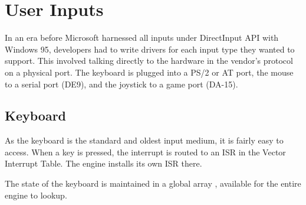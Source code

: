 \section{User Inputs}
In an era before Microsoft harnessed all inputs under DirectInput API with Windows 95, developers had to write drivers for each input type they wanted to support. This involved talking directly to the hardware in the vendor's protocol on a physical port. The keyboard is plugged into a PS/2 or AT port, the mouse to a serial port (DE9), and the joystick to a game port (DA-15).





\subsection{Keyboard}

As the keyboard is the standard and oldest input medium, it is fairly easy to access. When a key is pressed, the interrupt is routed to an ISR in the Vector Interrupt Table. The engine installs its own ISR there.\\


\par
\begin{minipage}{\textwidth}

\end{minipage}

The state of the keyboard is maintained in a global array , available for the entire engine to lookup.\\
\par

\begin{minipage}{\textwidth}

\end{minipage}



